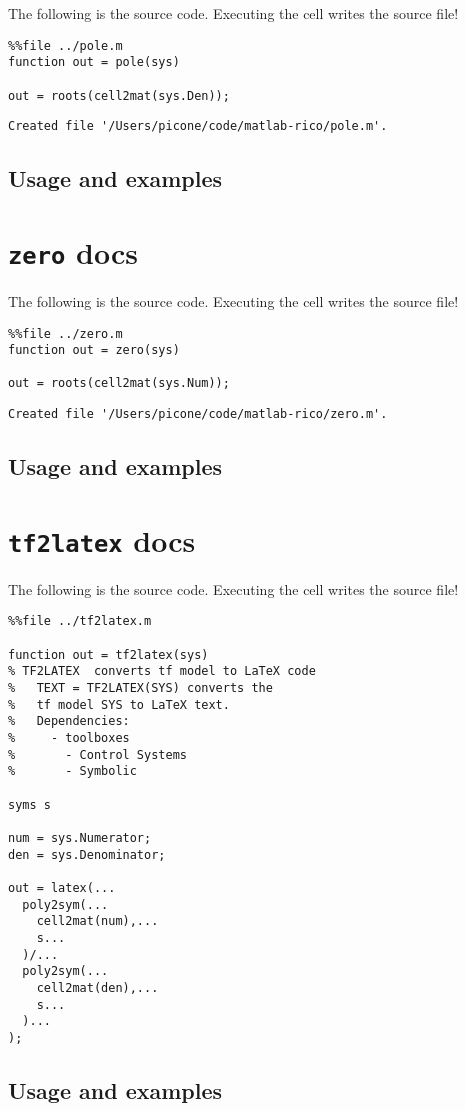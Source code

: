 The following is the source code. Executing the cell writes the source
file!

\begin{verbatim}
%%file ../pole.m
function out = pole(sys)

out = roots(cell2mat(sys.Den));
\end{verbatim}

\begin{verbatim}
Created file '/Users/picone/code/matlab-rico/pole.m'.
\end{verbatim}

\hypertarget{usage-and-examples-2}{%
\subsection{Usage and examples}\label{usage-and-examples-2}}

\hypertarget{zero-docs}{%
\section{\texorpdfstring{\texttt{zero}
docs}{ docs}}\label{zero-docs}}

The following is the source code. Executing the cell writes the source
file!

\begin{verbatim}
%%file ../zero.m
function out = zero(sys)

out = roots(cell2mat(sys.Num));
\end{verbatim}

\begin{verbatim}
Created file '/Users/picone/code/matlab-rico/zero.m'.
\end{verbatim}

\hypertarget{usage-and-examples-3}{%
\subsection{Usage and examples}\label{usage-and-examples-3}}

\hypertarget{tf2latex-docs}{%
\section{\texorpdfstring{\texttt{tf2latex}
docs}{ docs}}\label{tf2latex-docs}}

The following is the source code. Executing the cell writes the source
file!

\begin{verbatim}
%%file ../tf2latex.m

function out = tf2latex(sys)
% TF2LATEX  converts tf model to LaTeX code
%   TEXT = TF2LATEX(SYS) converts the
%   tf model SYS to LaTeX text.
%   Dependencies: 
%     - toolboxes
%       - Control Systems
%       - Symbolic

syms s

num = sys.Numerator;
den = sys.Denominator;

out = latex(...
  poly2sym(...
    cell2mat(num),...
    s...
  )/...
  poly2sym(...
    cell2mat(den),...
    s...
  )...
);
\end{verbatim}

\hypertarget{usage-and-examples-4}{%
\subsection{Usage and examples}\label{usage-and-examples-4}}
